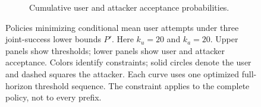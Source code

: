 \begin{figure}[t]
\begin{subfigure}{\columnwidth}
\caption{Cumulative user and attacker acceptance probabilities.}
\end{subfigure}
\par\medskip
\caption{Policies minimizing conditional mean user attempts under three joint-success lower bounds $P'$. Here $k_u=20$ and $k_a=20$.
Upper panels show thresholds; lower panels show user and attacker acceptance.
Colors identify constraints; solid circles denote the user and dashed squares the attacker.
Each curve uses one optimized full-horizon threshold sequence.
The constraint applies to the complete policy, not to every prefix.}
\label{fig:livdet_success_constraints_comparison}
\end{figure}

